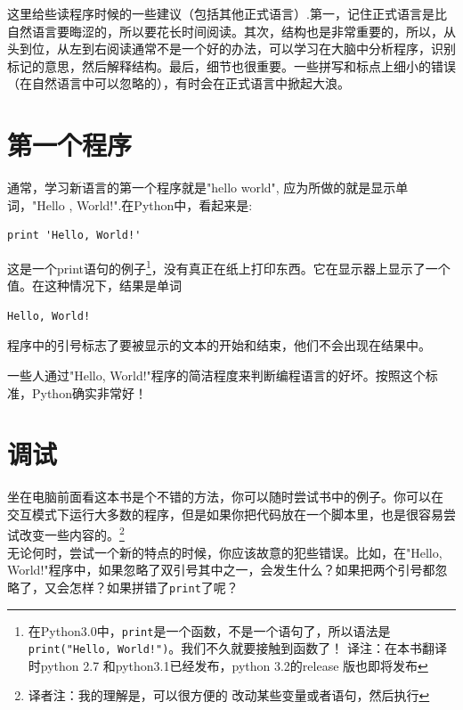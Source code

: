 这里给些读程序时候的一些建议（包括其他正式语言）.第一，记住正式语言是比自然语言要晦涩的，所以要花长时间阅读。其次，结构也是非常重要的，所以，从头到位，从左到右阅读通常不是一个好的办法，可以学习在大脑中分析程序，识别标记的意思，然后解释结构。最后，细节也很重要。一些拼写和标点上细小的错误（在自然语言中可以忽略的），有时会在正式语言中掀起大浪。

\section{第一个程序}
\label{hello}

通常，学习新语言的第一个程序就是"hello world", 应为所做的就是显示单词，"Hello , World!".在Python中，看起来是:

\beforeverb
\begin{verbatim}
print 'Hello, World!'
\end{verbatim}
\afterverb

这是一个print语句的例子\footnote{在Python3.0中，{\tt print}是一个函数，不是一个语句了，所以语法是{\tt print("Hello, World!")}。我们不久就要接触到函数了！  译注：在本书翻译时python 2.7 和python3.1已经发布，python 3.2的release 版也即将发布}，没有真正在纸上打印东西。它在显示器上显示了一个值。在这种情况下，结果是单词


\beforeverb
\begin{verbatim}
Hello, World!
\end{verbatim}
\afterverb

程序中的引号标志了要被显示的文本的开始和结束，他们不会出现在结果中。


一些人通过"Hello, World!"程序的简洁程度来判断编程语言的好坏。按照这个标准，Python确实非常好！


\section{调试}

坐在电脑前面看这本书是个不错的方法，你可以随时尝试书中的例子。你可以在
交互模式下运行大多数的程序，但是如果你把代码放在一个脚本里，也是很容易尝试改变一些内容的。\footnote{译者注：我的理解是，可以很方便的
改动某些变量或者语句，然后执行}\\

无论何时，尝试一个新的特点的时候，你应该故意的犯些错误。比如，在"Hello, World!"程序中，如果忽略了双引号其中之一，会发生什么？如果把两个引号都忽略了，又会怎样？如果拼错了{\tt print}了呢？\\

